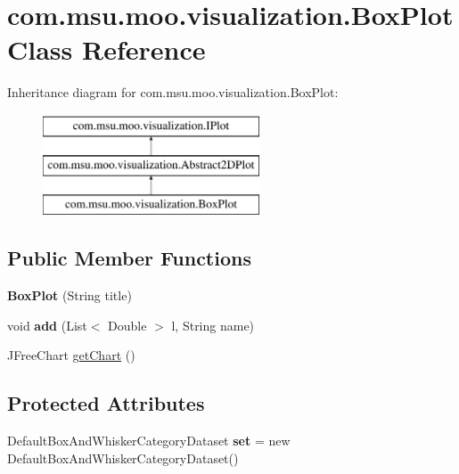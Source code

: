 \hypertarget{classcom_1_1msu_1_1moo_1_1visualization_1_1BoxPlot}{\section{com.\-msu.\-moo.\-visualization.\-Box\-Plot Class Reference}
\label{classcom_1_1msu_1_1moo_1_1visualization_1_1BoxPlot}
}
Inheritance diagram for com.\-msu.\-moo.\-visualization.\-Box\-Plot\-:\begin{figure}[H]
\begin{center}
\leavevmode
\includegraphics[height=3.000000cm]{classcom_1_1msu_1_1moo_1_1visualization_1_1BoxPlot}
\end{center}
\end{figure}
\subsection*{Public Member Functions}
\begin{DoxyCompactItemize}
\item 
\hypertarget{classcom_1_1msu_1_1moo_1_1visualization_1_1BoxPlot_a55aa11ce9cc53f6eb15c2aa652d104a5}{{\bfseries Box\-Plot} (String title)}\label{classcom_1_1msu_1_1moo_1_1visualization_1_1BoxPlot_a55aa11ce9cc53f6eb15c2aa652d104a5}

\item 
\hypertarget{classcom_1_1msu_1_1moo_1_1visualization_1_1BoxPlot_ab03b603543005ad2490338eed1f36401}{void {\bfseries add} (List$<$ Double $>$ l, String name)}\label{classcom_1_1msu_1_1moo_1_1visualization_1_1BoxPlot_ab03b603543005ad2490338eed1f36401}

\item 
J\-Free\-Chart \hyperlink{classcom_1_1msu_1_1moo_1_1visualization_1_1BoxPlot_acfbffc8df459e92c6b39108371fd462c}{get\-Chart} ()
\end{DoxyCompactItemize}
\subsection*{Protected Attributes}
\begin{DoxyCompactItemize}
\item 
\hypertarget{classcom_1_1msu_1_1moo_1_1visualization_1_1BoxPlot_a73e78f7007cbce86e9b45ced47b2797b}{Default\-Box\-And\-Whisker\-Category\-Dataset {\bfseries set} = new Default\-Box\-And\-Whisker\-Category\-Dataset()}\label{classcom_1_1msu_1_1moo_1_1visualization_1_1BoxPlot_a73e78f7007cbce86e9b45ced47b2797b}

\end{DoxyCompactItemize}


